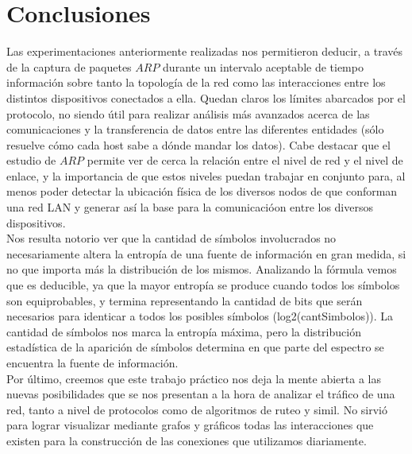 \section{Conclusiones}
Las experimentaciones anteriormente realizadas nos permitieron deducir, a través de la captura
de paquetes $ARP$ durante un intervalo aceptable de tiempo información sobre tanto la topología de la red como las
interacciones entre los distintos dispositivos conectados a ella. Quedan claros los límites abarcados por el protocolo,
no siendo útil para realizar análisis más avanzados acerca de las comunicaciones y la transferencia de datos entre las
diferentes entidades (sólo resuelve cómo cada host sabe a dónde mandar los datos). Cabe destacar que el
estudio de $ARP$ permite ver de cerca la relación entre el nivel de red y el nivel de enlace, y la importancia de que
estos niveles puedan trabajar en conjunto para, al menos poder detectar la ubicación física de los diversos nodos de
que conforman una red LAN y generar así la base para la comunicacióon entre los diversos dispositivos.\\

Nos resulta notorio ver que la cantidad de símbolos involucrados no necesariamente altera la entropía de una fuente
de información en gran medida, si no que importa más la distribución de los mismos. Analizando la fórmula vemos que
es deducible, ya que la mayor entropía se produce cuando todos los símbolos son equiprobables, y termina representando
la cantidad de bits que serán necesarios para identicar a todos los posibles símbolos (log2(cantSimbolos)). La cantidad
de símbolos nos marca la entropía máxima, pero la distribución estadística de la aparición de símbolos determina en
que parte del espectro se encuentra la fuente de información.\\

Por último, creemos que este trabajo práctico nos deja la mente abierta a las nuevas posibilidades que se nos
presentan a la hora de analizar el tráfico de una red, tanto a nivel de protocolos como de algoritmos de ruteo y simil. 
No sirvió para lograr visualizar mediante grafos y gráficos todas las interacciones que existen para la construcción de las conexiones 
que utilizamos diariamente.